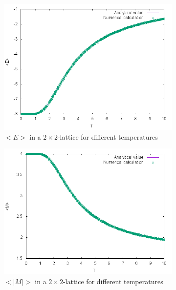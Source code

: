 \documentclass[10pt,a4paper]{article}
\begin{document}
\begin{figure}[h]
\centering
\begin{subfigure}{0.45\textwidth}
\centering
	\includegraphics[width=\textwidth]{Energy.png}
	\caption{$<E>$ in a $2\times 2$-lattice for different temperatures\label{b_E}}
\end{subfigure}
\begin{subfigure}{0.45\textwidth}
\centering
	\includegraphics[width=\textwidth]{Magnetization.png}
	\caption{$<|M|>$ in a $2\times 2$-lattice for different temperatures\label{b_M}}
\end{subfigure}
\begin{subfigure}{0.45\textwidth}
\centering

\end{subfigure}
\end{figure}
\end{document}
